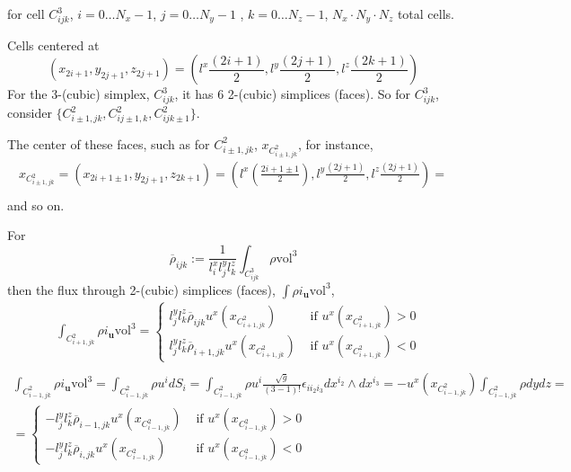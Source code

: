 \documentclass[10pt, landscape]{amsart}
\begin{document}
{\LARGE

for cell $C^3_{ijk}$, $i=0 \dots N_x-1$, $j=0 \dots N_y-1$ , $k=0 \dots N_z-1$, $N_x\cdot N_y \cdot N_z$ total cells.

Cells centered at
\[
(x_{2i+1}, y_{2j+1}, z_{2j+1}) = (l^x \frac{ (2i+1)}{2} , l^y \frac{(2j+1)}{2}, l^z \frac{(2k+1)}{2} ) %
\]
For the 3-(cubic) simplex, $C^3_{ijk}$, it has 6 2-(cubic) simplices (faces).  So for $C_{ijk}^3$, consider $\lbrace C^2_{i\pm 1, jk}, C^2_{ij\pm 1,k}, C^2_{ijk\pm 1}\rbrace$.

The center of these faces, such as for $C^2_{i\pm 1, jk}$, $x_{ C^2_{i\pm 1, jk} }$, for instance,
\[
\begin{aligned}
  x_{C^2_{i\pm 1,jk}} = (x_{2i+1\pm 1},y_{2j+1},z_{2k+1}) = (l^x\left( \frac{2i+1\pm 1}{2}\right) , l^y\frac{(2j+1)}{2},  l^z\frac{(2j+1)}{2} ) = \\
  \end{aligned}
\]
and so on.

For
\[
\overline{\rho}_{ijk} := \frac{1}{l_i^x l_j^yl^z_k} \int_{C^3_{ijk}} \rho \text{vol}^3
\]
then the flux through 2-(cubic) simplices (faces), $\int \rho i_{\mathbf{u}}\text{vol}^3$,
\[
\begin{aligned}
 &  \int_{C^2_{i+1,jk}} \rho i_{\mathbf{u}} \text{vol}^3 = \begin{cases} l_j^yl_k^z \overline{\rho}_{ijk} u^x(x_{C^2_{i+1, jk} } ) & \text{ if } u^x(x_{C^2_{i+1,jk} }) > 0 \\ 
 l_j^y l^z_k \overline{\rho}_{i+1,jk} u^x(x_{C^2_{i+1, jk} } ) & \text{ if } u^x(x_{C^2_{i+1,jk} }) < 0 \end{cases} \\
\end{aligned}
\]
\[
\begin{gathered}
  \int_{C^2_{i-1,jk}} \rho i_{\mathbf{u}} \text{vol}^3 = \int_{C^2_{i-1,jk}} \rho u^i dS_i = \int_{C^2_{i-1,jk}} \rho u^i \frac{ \sqrt{g}}{ (3-1)!} \epsilon_{ii_2i_3} dx^{i_2} \wedge dx^{i_3} = -u^x(x_{C^2_{i-1,jk}}) \int_{C^2_{i-1,jk} } \rho dy dz = \\
  = \begin{cases}
    -l_j^y l^z_k \overline{\rho}_{i-1,jk} u^x(x_{C^2_{i-1,jk}}) & \text{ if } u^x(x_{C^2_{i-1,jk}}) > 0 \\
        -l_j^y l^z_k \overline{\rho}_{i,jk} u^x(x_{C^2_{i-1,jk}}) & \text{ if } u^x(x_{C^2_{i-1,jk}}) < 0 
    \end{cases}
\end{gathered}
\]

  

}
\end{document}
